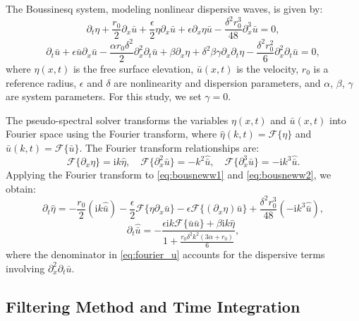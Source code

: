 \documentclass[alpha-refs, 12pt]{wiley-article}
\newcommand{\ui}{\mathrm{i}}
\begin{document}
The Boussinesq system, modeling nonlinear dispersive waves, is given by:
\begin{equation}\label{eq:bousneww1}
  \partial_t \eta + \frac{r_0}{2} \partial_x \bar{u} + \frac{\epsilon}{2} \eta \partial_x \bar{u} + \epsilon \partial_x \eta \bar{u} - \frac{\delta^2 r_0^3}{48} \partial_x^3 \bar{u} = 0,
\end{equation}
\begin{equation}\label{eq:bousneww2}
  \partial_t \bar{u} + \epsilon \bar{u} \partial_x \bar{u} - \frac{\alpha r_0 \delta^2}{2} \partial_x^2 \partial_t \bar{u} + \beta \partial_x \eta + \delta^2 \beta \gamma \partial_x \partial_t \eta - \frac{\delta^2 r_0^2}{6} \partial_x^2 \partial_t \bar{u} = 0,
\end{equation}
where $\eta(x,t)$ is the free surface elevation, $\bar{u}(x,t)$ is the velocity, $r_0$ is a reference radius, $\epsilon$ and $\delta$ are nonlinearity and dispersion parameters, and $\alpha$, $\beta$, $\gamma$ are system parameters. For this study, we set $\gamma = 0$.

The pseudo-spectral solver transforms the variables $\eta(x,t)$ and $\bar{u}(x,t)$ into Fourier space using the Fourier transform, where $\hat{\eta}(k,t) = \mathcal{F}\{\eta\}$ and $\hat{\bar{u}}(k,t) = \mathcal{F}\{\bar{u}\}$. The Fourier transform relationships are:
\[
  \mathcal{F}\{\partial_x \eta\} = \ui k \hat{\eta}, \quad \mathcal{F}\{\partial_x^2 \bar{u}\} = -k^2 \hat{\bar{u}}, \quad \mathcal{F}\{\partial_x^3 \bar{u}\} = -\ui k^3 \hat{\bar{u}}.
\]
Applying the Fourier transform to \eqref{eq:bousneww1} and \eqref{eq:bousneww2}, we obtain:
\begin{equation}\label{eq:fourier_eta}
  \partial_t \hat{\eta} = - \frac{r_0}{2} (\ui k \hat{\bar{u}}) - \frac{\epsilon}{2} \mathcal{F}\{\eta \partial_x \bar{u}\} - \epsilon \mathcal{F}\{(\partial_x \eta) \bar{u}\} + \frac{\delta^2 r_0^3}{48} (-\ui k^3 \hat{\bar{u}}),
\end{equation}
\begin{equation}\label{eq:fourier_u}
  \partial_t \hat{\bar{u}} = - \frac{\epsilon \ui k \mathcal{F}\{\bar{u} \bar{u}\} + \beta \ui k \hat{\eta}}{1 + \frac{r_0 \delta^2 k^2 (3 \alpha + r_0)}{6}},
\end{equation}
where the denominator in \eqref{eq:fourier_u} accounts for the dispersive terms involving $\partial_x^2 \partial_t \bar{u}$.

\subsection{Filtering Method and Time Integration}
\end{document}
